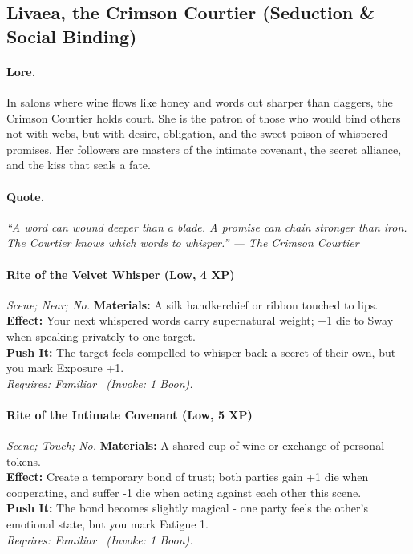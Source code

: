 \subsection{Livaea, the Crimson Courtier (Seduction \& Social Binding)}

\paragraph{Lore.}
In salons where wine flows like honey and words cut sharper than daggers, the Crimson Courtier holds court. She is the patron of those who would bind others not with webs, but with desire, obligation, and the sweet poison of whispered promises. Her followers are masters of the intimate covenant, the secret alliance, and the kiss that seals a fate.

\paragraph{Quote.}
\emph{“A word can wound deeper than a blade. A promise can chain stronger than iron. The Courtier knows which words to whisper.” — The Crimson Courtier}

\paragraph{Rite of the Velvet Whisper (Low, 4 XP)} \emph{Scene; Near; No.}
\textbf{Materials:} A silk handkerchief or ribbon touched to lips. \\
\textbf{Effect:} Your next whispered words carry supernatural weight; +1 die to Sway when speaking privately to one target. \\
\textbf{Push It:} The target feels compelled to whisper back a secret of their own, but you mark Exposure +1. \\
\emph{Requires: Familiar \ (\textit{Invoke:} 1 Boon).}

\paragraph{Rite of the Intimate Covenant (Low, 5 XP)} \emph{Scene; Touch; No.}
\textbf{Materials:} A shared cup of wine or exchange of personal tokens. \\
\textbf{Effect:} Create a temporary bond of trust; both parties gain +1 die when cooperating, and suffer -1 die when acting against each other this scene. \\
\textbf{Push It:} The bond becomes slightly magical - one party feels the other's emotional state, but you mark Fatigue 1. \\
\emph{Requires: Familiar \ (\textit{Invoke:} 1 Boon).}

